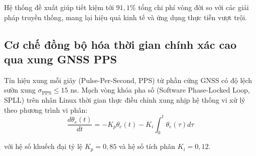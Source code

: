 \begin{table}[H]
\centering
\caption{Bảng phân tích và đối chiếu chi phí vòng đời 3 năm cho phi đội 50 trạm đo cơ động}
\label{tab:tco-life-cycle-table}
\end{table}

Hệ thống đề xuất giúp tiết kiệm tới $91{,}1\%$ tổng chi phí vòng đời so với các giải pháp truyền thống, mang lại hiệu quả kinh tế và ứng dụng thực tiễn vượt trội.

\subsection{Cơ chế đồng bộ hóa thời gian chính xác cao qua xung GNSS PPS}

\hspace{0.5cm} Tín hiệu xung mỗi giây (Pulse-Per-Second, PPS) từ phần cứng GNSS có độ lệch sườn xung $\sigma_{\text{PPS}} \le 15$ ns. Mạch vòng khóa pha số (Software Phase-Locked Loop, SPLL) trên nhân Linux thời gian thực điều chỉnh xung nhịp hệ thống vi xử lý theo phương trình vi phân:
\begin{equation}
\frac{d \theta_e(t)}{dt} = - K_p \theta_e(t) - K_i \int_0^t \theta_e(\tau) d\tau
\label{eq:spll-phase-locked-loop}
\end{equation}

với hệ số khuếch đại tỷ lệ $K_p = 0{,}85$ và hệ số tích phân $K_i = 0{,}12$.


